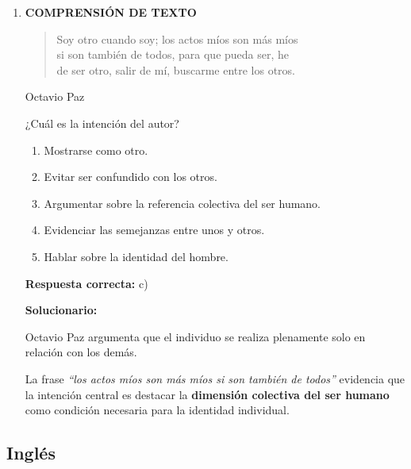 \begin{enumerate}[resume]
	\vspace{2mm}
	\textbf{Solucionario:}
	
	El orden lógico es: primero concluye la secundaria (II), luego expresa su deseo de seguir estudios (IV), después reconoce la competencia y se prepara (III), luego da el examen (V) y finalmente, al ingresar, se proyecta a estudiar la carrera (I).
	

	
	\vspace{6mm}
	
	\item \textbf{COMPRENSIÓN DE TEXTO}
	
	\begin{quote}
		Soy otro cuando soy; los actos míos son más míos\\
		si son también de todos, para que pueda ser, he\\
		de ser otro, salir de mí, buscarme entre los otros.
	\end{quote}
	\hfill Octavio Paz
	
	¿Cuál es la intención del autor?
	\begin{enumerate}[label=\alph*)]
		\item Mostrarse como otro.
		\item Evitar ser confundido con los otros.
		\item Argumentar sobre la referencia colectiva del ser humano.
		\item Evidenciar las semejanzas entre unos y otros.
		\item Hablar sobre la identidad del hombre.
	\end{enumerate}
	\textbf{Respuesta correcta:} c)
	
	\vspace{2mm}
	\textbf{Solucionario:}
	
	Octavio Paz argumenta que el individuo se realiza plenamente solo en relación con los demás.
	
	La frase \textit{``los actos míos son más míos si son también de todos''} evidencia que la intención central es destacar la \textbf{dimensión colectiva del ser humano} como condición necesaria para la identidad individual.
	

	
	\vspace{6mm}
\end{enumerate}

\subsection*{Inglés}

